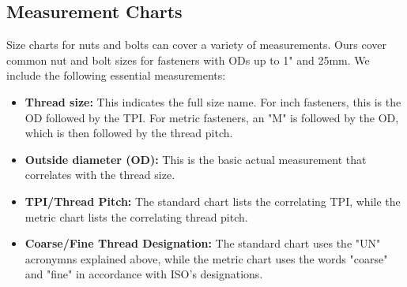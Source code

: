 \documentclass[12pt, a4paper]{article}
\providecommand{\tightlist}{%
	\setlength{\itemsep}{0pt}\setlength{\parskip}{0pt}}
\providecommand{\tightlist}{%
	\setlength{\itemsep}{0pt}\setlength{\parskip}{0pt}}
\begin{document}
		\hypertarget{iz6h0v3}{%
			\subsection{Measurement Charts}\label{iz6h0v3}}
		
		\hypertarget{idtx4l}{}
		Size charts for nuts and bolts can cover a variety of measurements. Ours
		cover common nut and bolt sizes for fasteners with ODs up to 1" and
		25mm. We include the following essential measurements:
		
		\begin{itemize}
			\tightlist
			\item
			\textbf{Thread size:} This indicates the full size name. For inch
			fasteners, this is the OD followed by the TPI. For metric fasteners,
			an "M" is followed by the OD, which is then followed by the thread
			pitch.
			\item
			\textbf{Outside diameter (OD):} This is the basic actual measurement
			that correlates with the thread size.
			\item
			\textbf{TPI/Thread Pitch:} The standard chart lists the correlating
			TPI, while the metric chart lists the correlating thread pitch.
			\item
			\textbf{Coarse/Fine Thread Designation:} The standard chart uses the
			"UN" acronymns explained above, while the metric chart uses the words
			"coarse" and "fine" in accordance with ISO's designations.
		\end{itemize}
		
\end{document}
